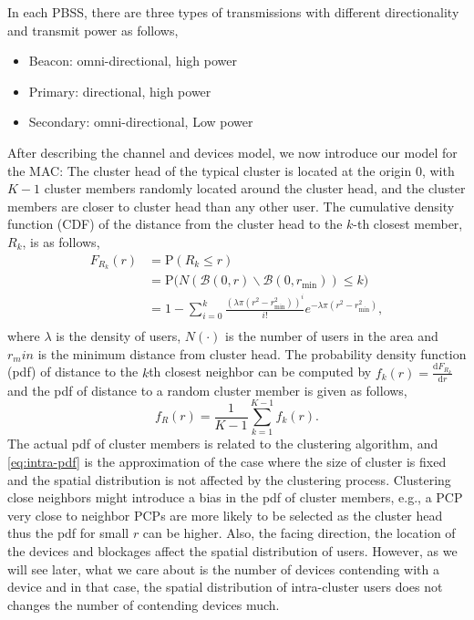 \documentclass[10pt, conference, letterpaper]{IEEEtran}
\begin{document}
In each PBSS, there are three types of transmissions with different directionality and transmit power as follows,
\begin{itemize}
	\item Beacon: omni-directional, high power
	\item Primary: directional, high power
	\item Secondary: omni-directional, Low power
\end{itemize}



After describing the channel and devices model, we now introduce our model for the MAC: 
The cluster head of the typical cluster is located at the origin $0$, with $K-1$ cluster members randomly 
located around the cluster head, and the cluster members are closer to cluster head than any other user. 
The cumulative density function (CDF) of the distance from the cluster head to the $k$-th closest member, $R_k$, is as follows,
\begin{align*}
F_{R_k}(r) & = \mathrm{P}(R_k \leq r) \\
& = \mathrm{P}\big(N(\mathcal{B}(0, r)\backslash \mathcal{B}(0, r_{\min}))\leq k\big) \\
& = 1 - \sum\limits_{i=0}^{k}\frac{(\lambda \pi (r^2 - r_{\min}^2))^i}{i!}e^{-\lambda\pi (r^2-r_{\min}^2)},  \\
\end{align*}
where $\lambda$ is the density of users, $N(\cdot)$ is the number of users in the area and $r_min$ is the minimum distance from cluster head.
The probability density function (pdf) of distance to the $k$th closest neighbor can be computed by $f_k(r) = \frac{\mathrm{d} F_{R_k}}{\mathrm{d} r}$ and the pdf of distance to a random cluster member is given as follows,
\begin{equation} \label{eq:intra-pdf}
f_R(r) = \frac{1}{K-1}\sum\limits_{k = 1}^{K - 1}f_{k}(r).
\end{equation}
The actual pdf of cluster members is related to the clustering algorithm, and \ref{eq:intra-pdf} is the approximation of the case where the size of cluster is fixed and the spatial distribution is not affected by the clustering process. Clustering close neighbors might introduce a bias in the pdf of cluster members, e.g., a PCP very close to neighbor PCPs are more likely to be selected as the cluster head thus the pdf for small $r$ can be higher. Also, the facing direction, the location of the devices and blockages affect the spatial distribution of users. However, as we will see later, what we care about is the number of devices contending with a device and in that case, the spatial distribution of intra-cluster users does not changes the number of contending devices much. 
\end{document}
